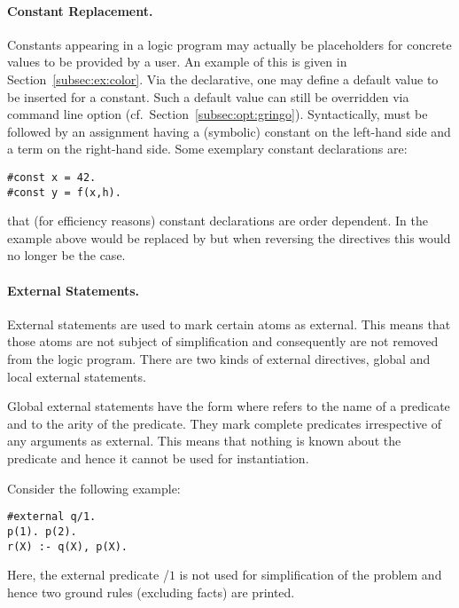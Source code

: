 \paragraph{Constant Replacement.}
%
Constants appearing in a logic program may actually be placeholders for
concrete values to be provided by a user.
An example of this is given in Section~\ref{subsec:ex:color}.
Via the  declarative,
one may define a default value to be inserted for a constant.
Such a default value can still be overridden via command line option
 (cf.\ Section~\ref{subsec:opt:gringo}).
Syntactically,  must be followed by an assignment having
a (symbolic) constant on the left-hand side and a term on the right-hand side.
Some exemplary constant declarations are:
%
\begin{lstlisting}[numbers=none]
#const x = 42.
#const y = f(x,h).
\end{lstlisting}

\begin{note}
that (for efficiency reasons) constant declarations are order dependent.
In the example above  would be replaced by 
but when reversing the directives this would no longer be the case.
\end{note}

\paragraph{External Statements.}
%
External statements are used to mark certain atoms as external. This means 
that those atoms are not subject of simplification and consequently are not removed 
from the logic program. There are two kinds of external directives, 
global and local external statements.

Global external statements have the form  where 
 refers to the name of a predicate and  to the arity of the predicate.
They mark complete predicates irrespective of any arguments as external.
This means that nothing is known about the predicate and hence it cannot be used 
for instantiation.
\begin{example}
Consider the following example:
\begin{lstlisting}[numbers=none]
#external q/1.
p(1). p(2).
r(X) :- q(X), p(X).
\end{lstlisting}
Here, the external predicate /$1$ is not used for simplification
of the problem and hence two ground rules (excluding facts) are printed.
\eexample
\end{example}

